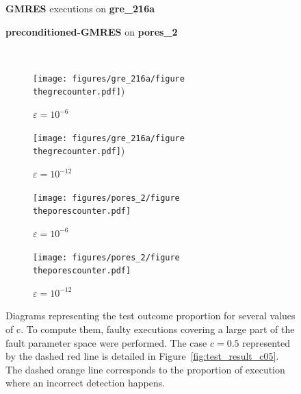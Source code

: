 \documentclass[twoside]{article}
\newcounter{fig}\setcounter{fig}{0}
\begin{document}
  \begin{figure}[H]
    \centering
    
    \begin{minipage}[b]{0.45\linewidth}
      \centering
      \textbf{GMRES} executions on \textbf{gre_216a} 
    \end{minipage}
    \quad
    \begin{minipage}{0.45\linewidth}
      \centering
      \textbf{preconditioned-GMRES} on \textbf{pores_2}
    \end{minipage}\\


    \begin{minipage}[b]{0.48\linewidth}
      
      \begin{subfigure}[t]{\linewidth}
        \centering
        \texttt{[image: figures/gre\_216a/figure\\thegrecounter.pdf]})
        \caption{$\varepsilon = 10^{-6}$}\label{fig:gre_216a_test_result_0}	
      \end{subfigure}
      \quad
      \begin{subfigure}[t]{\linewidth}
        \centering
        \texttt{[image: figures/gre\_216a/figure\\thegrecounter.pdf]})
        \caption{$\varepsilon = 10^{-12}$}\label{fig:gre_216a_test_result_1}	
      \end{subfigure}
    \end{minipage}
    \quad
    \begin{minipage}[b]{0.48\linewidth}
      
      \begin{subfigure}[t]{\linewidth}
        \centering
        \texttt{[image: figures/pores\_2/figure\\theporescounter.pdf]}
        \caption{$\varepsilon = 10^{-6}$}\label{fig:pores_2_test_result_0}	
      \end{subfigure}
      \quad
      \begin{subfigure}[t]{\linewidth}
        \centering
        \texttt{[image: figures/pores\_2/figure\\theporescounter.pdf]}
        \caption{$\varepsilon = 10^{-12}$}\label{fig:pores_2_test_result_1}	
      \end{subfigure}

    \end{minipage}
    \caption{Diagrams representing the test outcome proportion for several values of c. To compute them, faulty executions covering a large part of the fault parameter space were performed. The case $c = 0.5$ represented by the dashed red line is detailed in Figure~\ref{fig:test_result_c05}. The dashed orange line corresponds to the proportion of execution where an incorrect detection happens.}\label{fig:test_result}
  \end{figure}
\end{document}
